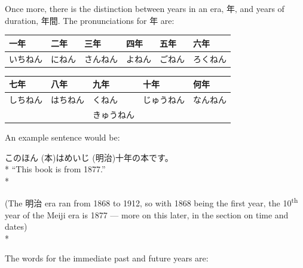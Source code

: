 \documentclass[11pt, b5paper, twoside, openright, onecolumn]{book}
\makeatletter
\newcommand*{\rubystack}[2]{{\relscale{0.5}%
  \begin{tabular}[b]{@{}c@{}}%
    {#1}\\%
   {\textscale{2}{#2}}%
  \end{tabular}}%
}
\DeclareRobustCommand*{\ruby}[2]{%
  \mbox{%
    \setlength{\parskip}{0ex}%
    \BeginAccSupp{method=pdfstringdef,ActualText={#1}}%
      \rubystack{\phantom{#2}}{#1}%
      \llap{%
        \rubystack{#2}{\phantom{#1}}%
      }%
    \EndAccSupp{}%
  }%
}
\renewcommand*{\ruby}[2]{#2 (#1)}%
\newenvironment{exampleblock}{
\setlength{\parindent}{0.6in}
\begin{minipage}[t]{\dimexpr\textwidth-\parindent}}
{\end{minipage}}
\newenvironment{mytabular}[1]{\noindent\hspace{0.4in}
\begin{tabular}[h]{#1}}{\end{tabular}}
\makeatother
\begin{document}
Once more‚ there is the distinction between years in an era‚ 年‚ and years of duration‚ 年間. The pronunciations for 年 are:

\vspace{0.5cm}
\smaller
\begin{mytabular}{| l  l  l  l  l  l |}\hline 
\rule{0pt}{2.4ex}一年 & 二年 & 三年 & 四年 & 五年 & 六年\\ 
\hline
\rule{0pt}{2.4ex}いちねん & にねん & さんねん & よねん & ごねん & ろくねん\\ 
\hline 
\end{mytabular}
\larger
\vspace{0.5cm}

\smaller
\begin{mytabular}{| l  l  l  l  l |}\hline 
\rule{0pt}{2.4ex}七年 & 八年 & 九年 & 十年 & 何年\\ 
\hline
\rule{0pt}{2.4ex}しちねん & はちねん & くねん & じゅうねん & なんねん\\ 
\rule{0pt}{2.4ex} &  & きゅうねん &  & \\ 
\hline 
\end{mytabular}
\larger
\vspace{0.5cm}


An example sentence would be:

\vspace{0.4cm}
\begin{exampleblock}
この\ruby{本}{ほん}は\ruby{明治}{めいじ}十年の本です。 \\* 
“This book is from 1877.” \\* 
\end{exampleblock}
\vspace{0.2cm}

\begin{exampleblock}
(The 明治 era ran from 1868 to 1912‚ so with 1868 being the first year‚ the 10\textsuperscript{th} year of the Meiji era is 1877 — more on this later‚ in the section on time and dates) \\* 
\end{exampleblock}
\vspace{0.2cm}

The words for the immediate past and future years are:
\end{document}

